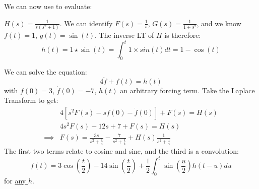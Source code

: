 \documentclass[../Main.tex]{subfiles}
\begin{document}
\begin{examples}{
        We can now use  to evaluate:
    }
    \item $H(s) = \frac{1}{s(s^2 + 1)}$. We can identify $F(s) = \frac1s$, $G(s) = \frac{1}{1 + s^2}$, and we know $f(t) = 1$, $g(t) = \sin(t)$. The inverse LT of $H$ is therefore:
        \begin{equation*}
            h(t) = 1 \star \sin(t) = \int_{0}^{t} 1 \times sin(t) dt = 1 - \cos(t)
        \end{equation*}
    \item We can solve the equation:
        \begin{equation*}
            4\ddot{f} + f(t) = h(t)
        \end{equation*}
        with $f(0) = 3$, $\dot{f}(0) = -7$, $h(t)$ an arbitrary forcing term. Take the Laplace Transform to get:
        \begin{align*}
            &4\left[s^2 F(s) - sf(0) - \dot{f}(0)\right] + F(s) = H(s) \\
            &4s^2 F(s) - 12s + 7 + F(s) = H(s) \\
            \implies& F(s) = \frac{3s}{s^2 + \frac14} - \frac{7}{s^2 + \frac14} + H(s) \frac{1}{s^2 + \frac14}
        \end{align*}
        The first two terms relate to cosine and sine, and the third is a convolution:
        \begin{equation*}
            f(t) = 3\cos\left(\frac{t}2\right) - 14 \sin\left(\frac{t}{2}\right) + \frac12 \int_{0}^{t} \sin\left(\frac{u}{2}\right)h(t - u) du
        \end{equation*}
        for \underline{any $h$}.
\end{examples}
\end{document}
